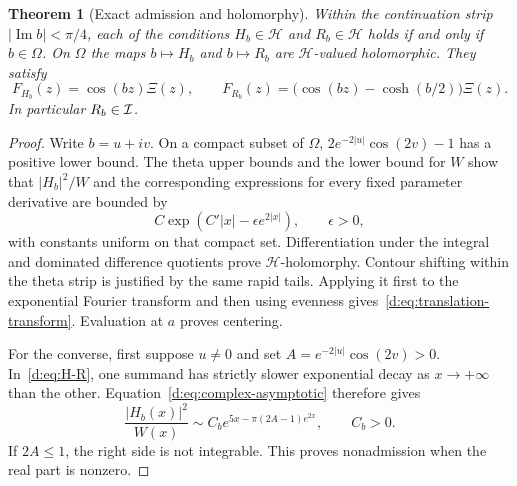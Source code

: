 \documentclass[11pt,a4paper]{article}
\numberwithin{equation}{section}
\newtheorem{theorem}{Theorem}[section]
\theoremstyle{definition}\newtheorem{definition}[theorem]{Definition}
\theoremstyle{remark}\newtheorem{remark}[theorem]{Remark}
\newcommand{\Hh}{\mathcal H}\newcommand{\Hw}{\mathcal H}
\begin{document}
\begin{theorem}[Exact admission and holomorphy]\label{d:thm:lens}
Within the continuation strip $|\operatorname{Im}b|<\pi/4$, each of the conditions $H_b\in\Hh$ and $R_b\in\Hh$ holds if and only if $b\in\Omega$. On $\Omega$ the maps $b\mapsto H_b$ and $b\mapsto R_b$ are $\Hh$-valued holomorphic. They satisfy
\begin{equation}\label{d:eq:translation-transform}
 F_{H_b}(z)=\cos(bz)\Xi(z),\qquad
 F_{R_b}(z)=\bigl(\cos(bz)-\cosh(b/2)\bigr)\Xi(z).
\end{equation}
In particular $R_b\in\mathcal I$.
\end{theorem}
\begin{proof}
Write $b=u+iv$. On a compact subset of $\Omega$,
$2e^{-2|u|}\cos(2v)-1$ has a positive lower bound. The theta upper bounds and the lower bound for $W$ show that $|H_b|^2/W$ and the corresponding expressions for every fixed parameter derivative are bounded by
\begin{equation}\label{d:eq:lens-majorant}
 C\exp(C'|x|-\epsilon e^{2|x|}),\qquad \epsilon>0,
\end{equation}
with constants uniform on that compact set. Differentiation under the integral and dominated difference quotients prove $\Hh$-holomorphy. Contour shifting within the theta strip is justified by the same rapid tails. Applying it first to the exponential Fourier transform and then using evenness gives~\eqref{d:eq:translation-transform}. Evaluation at $a$ proves centering.

For the converse, first suppose $u\ne0$ and set $A=e^{-2|u|}\cos(2v)>0$. In~\eqref{d:eq:H-R}, one summand has strictly slower exponential decay as $x\to+\infty$ than the other. Equation~\eqref{d:eq:complex-asymptotic} therefore gives
\begin{equation}\label{d:eq:nonadmission-u}
 \frac{|H_b(x)|^2}{W(x)}
 \sim C_b e^{5x-\pi(2A-1)e^{2x}},\qquad C_b>0.
\end{equation}
If $2A\le1$, the right side is not integrable. This proves nonadmission when the real part is nonzero.


\end{proof}
\end{document}
